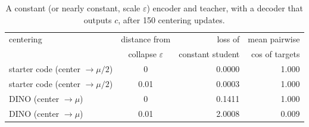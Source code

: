 \documentclass[11pt]{article}
\begin{document}
\begin{table}[H]
\centering\small
\begin{tabular}{lcrr}
\toprule
centering & distance from & loss of & mean pairwise\\
          & collapse $\varepsilon$ & constant student & cos of targets\\
\midrule
starter code (center $\to\mu/2$) & 0    & 0.0000 & 1.000\\
starter code (center $\to\mu/2$) & 0.01 & 0.0003 & 1.000\\
DINO (center $\to\mu$)           & 0    & 0.1411 & 1.000\\
DINO (center $\to\mu$)           & 0.01 & 2.0008 & 0.009\\
\bottomrule
\end{tabular}
\caption{A constant (or nearly constant, scale $\varepsilon$) encoder and teacher, with a decoder that outputs $c$, after 150 centering updates.}
\label{tab:center}
\end{table}
\end{document}
